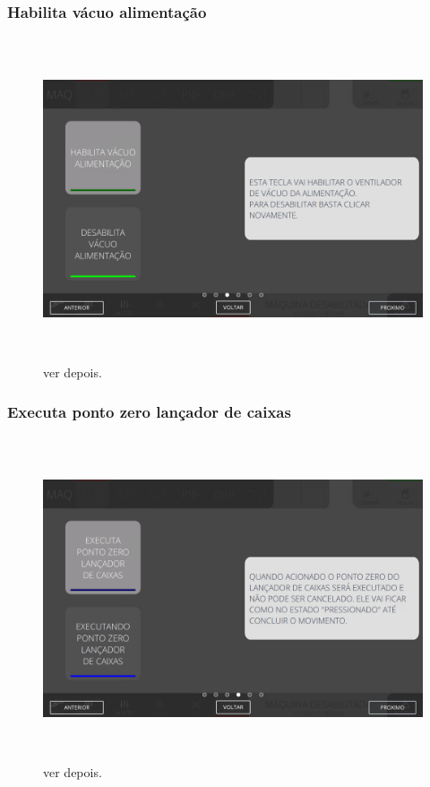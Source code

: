 \newpage
\thispagestyle{fancy}
\vspace*{\fill}
\subsubsection{\small{Habilita vácuo alimentação}}
\begin{figure}[h]
  \centering
  \includegraphics[width=576px,height=360px]{src/images/03-feeder/commands/e-3.png}
  \caption{ver depois.}
   \label{}
\end{figure}
\vspace*{\fill}

\newpage
\thispagestyle{fancy}
\vspace*{\fill}
\subsubsection{\small{Executa ponto zero lançador de caixas}}
\begin{figure}[h]
  \centering
  \includegraphics[width=576px,height=360px]{src/images/03-feeder/commands/e-4.png}
  \caption{ver depois.}
   \label{}
\end{figure}
\vspace*{\fill}

